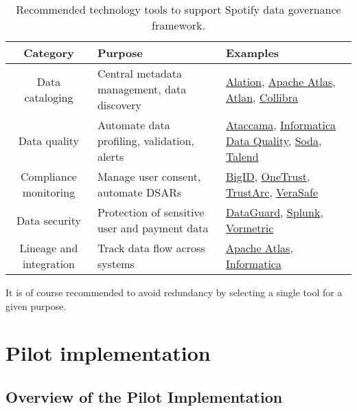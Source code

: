 \documentclass[11pt,a4paper,computermodern]{article}
\begin{document}
\begin{table}[h]
	\centering
	\begin{threeparttable}
		\caption{Recommended technology tools to support Spotify data governance framework.}
		\label{table:tools}
		\begin{tabularx}{0.99\textwidth}{c >{\centering\arraybackslash}X >{\centering\arraybackslash}X}
			\toprule
			Category & Purpose & Examples \\
			\midrule
			Data cataloging & Central metadata management, data discovery & \href{https://www.alation.com/}{Alation}, \href{https://atlas.apache.org/}{Apache Atlas}, \href{https://atlan.com/}{Atlan}, \href{https://www.collibra.com/}{Collibra} \\
			Data quality & Automate data profiling, validation, alerts & \href{https://www.ataccama.com/}{Ataccama}, \href{https://www.informatica.com/products/data-quality.html}{Informatica Data Quality}, \href{https://www.soda.io/}{Soda}, \href{https://www.talend.com/products/data-integrity-governance/}{Talend} \\
			Compliance monitoring & Manage user consent, automate DSARs & \href{https://bigid.com/}{BigID}, \href{https://www.onetrust.com/}{OneTrust}, \href{https://trustarc.com/}{TrustArc}, \href{https://verasafe.com/}{VeraSafe} \\
			Data security & Protection of sensitive user and payment data & \href{https://www.dataguard.com/}{DataGuard}, \href{https://www.splunk.com/}{Splunk}, \href{https://cpl.thalesgroup.com/encryption/vormetric-data-security-platform}{Vormetric} \\
			Lineage and integration & Track data flow across systems & \href{https://atlas.apache.org/}{Apache Atlas}, \href{https://www.informatica.com/products/data-quality.html}{Informatica} \\
			\bottomrule
		\end{tabularx}
	\end{threeparttable}
\end{table}

It is of course recommended to avoid redundancy by selecting a single tool for a given purpose.


\section*{Pilot implementation}

\subsection*{Overview of the Pilot Implementation}
\end{document}
